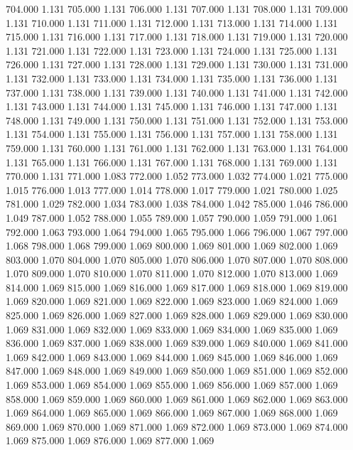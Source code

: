 704.000 1.131 
705.000 1.131 
706.000 1.131 
707.000 1.131 
708.000 1.131 
709.000 1.131 
710.000 1.131 
711.000 1.131 
712.000 1.131 
713.000 1.131 
714.000 1.131 
715.000 1.131 
716.000 1.131 
717.000 1.131 
718.000 1.131 
719.000 1.131 
720.000 1.131 
721.000 1.131 
722.000 1.131 
723.000 1.131 
724.000 1.131 
725.000 1.131 
726.000 1.131 
727.000 1.131 
728.000 1.131 
729.000 1.131 
730.000 1.131 
731.000 1.131 
732.000 1.131 
733.000 1.131 
734.000 1.131 
735.000 1.131 
736.000 1.131 
737.000 1.131 
738.000 1.131 
739.000 1.131 
740.000 1.131 
741.000 1.131 
742.000 1.131 
743.000 1.131 
744.000 1.131 
745.000 1.131 
746.000 1.131 
747.000 1.131 
748.000 1.131 
749.000 1.131 
750.000 1.131 
751.000 1.131 
752.000 1.131 
753.000 1.131 
754.000 1.131 
755.000 1.131 
756.000 1.131 
757.000 1.131 
758.000 1.131 
759.000 1.131 
760.000 1.131 
761.000 1.131 
762.000 1.131 
763.000 1.131 
764.000 1.131 
765.000 1.131 
766.000 1.131 
767.000 1.131 
768.000 1.131 
769.000 1.131 
770.000 1.131 
771.000 1.083 
772.000 1.052 
773.000 1.032 
774.000 1.021 
775.000 1.015 
776.000 1.013 
777.000 1.014 
778.000 1.017 
779.000 1.021 
780.000 1.025 
781.000 1.029 
782.000 1.034 
783.000 1.038 
784.000 1.042 
785.000 1.046 
786.000 1.049 
787.000 1.052 
788.000 1.055 
789.000 1.057 
790.000 1.059 
791.000 1.061 
792.000 1.063 
793.000 1.064 
794.000 1.065 
795.000 1.066 
796.000 1.067 
797.000 1.068 
798.000 1.068 
799.000 1.069 
800.000 1.069 
801.000 1.069 
802.000 1.069 
803.000 1.070 
804.000 1.070 
805.000 1.070 
806.000 1.070 
807.000 1.070 
808.000 1.070 
809.000 1.070 
810.000 1.070 
811.000 1.070 
812.000 1.070 
813.000 1.069 
814.000 1.069 
815.000 1.069 
816.000 1.069 
817.000 1.069 
818.000 1.069 
819.000 1.069 
820.000 1.069 
821.000 1.069 
822.000 1.069 
823.000 1.069 
824.000 1.069 
825.000 1.069 
826.000 1.069 
827.000 1.069 
828.000 1.069 
829.000 1.069 
830.000 1.069 
831.000 1.069 
832.000 1.069 
833.000 1.069 
834.000 1.069 
835.000 1.069 
836.000 1.069 
837.000 1.069 
838.000 1.069 
839.000 1.069 
840.000 1.069 
841.000 1.069 
842.000 1.069 
843.000 1.069 
844.000 1.069 
845.000 1.069 
846.000 1.069 
847.000 1.069 
848.000 1.069 
849.000 1.069 
850.000 1.069 
851.000 1.069 
852.000 1.069 
853.000 1.069 
854.000 1.069 
855.000 1.069 
856.000 1.069 
857.000 1.069 
858.000 1.069 
859.000 1.069 
860.000 1.069 
861.000 1.069 
862.000 1.069 
863.000 1.069 
864.000 1.069 
865.000 1.069 
866.000 1.069 
867.000 1.069 
868.000 1.069 
869.000 1.069 
870.000 1.069 
871.000 1.069 
872.000 1.069 
873.000 1.069 
874.000 1.069 
875.000 1.069 
876.000 1.069 
877.000 1.069 

